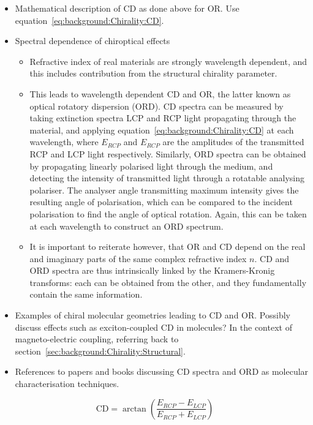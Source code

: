 \begin{itemize}
    \item Mathematical description of CD as done above for OR. Use equation~\ref{eq:background:Chirality:CD}.
    \item Spectral dependence of chiroptical effects
    \begin{itemize}
        \item Refractive index of real materials are strongly wavelength dependent, and this includes contribution from the structural chirality parameter.
        \item This leads to wavelength dependent CD and OR, the latter known as optical rotatory dispersion (ORD). CD spectra can be measured by taking extinction spectra LCP and RCP light propagating through the material, and applying equation~\ref{eq:background:Chirality:CD} at each wavelength, where $E_{RCP}$ and $E_{RCP}$ are the amplitudes of the transmitted RCP and LCP light respectively. Similarly, ORD spectra can be obtained by propagating linearly polarised light through the medium, and detecting the intensity of transmitted light through a rotatable analysing polariser. The analyser angle transmitting maximum intensity gives the resulting angle of polarisation, which can be compared to the incident polarisation to find the angle of optical rotation. Again, this can be taken at each wavelength to construct an ORD spectrum. 
        \item It is important to reiterate however, that OR and CD depend on the real and imaginary parts of the same complex refractive index $n$. CD and ORD spectra are thus intrinsically linked by the Kramers-Kronig transforms: each can be obtained from the other, and they fundamentally contain the same information. 
    \end{itemize}
    \item Examples of chiral molecular geometries leading to CD and OR. Possibly discuss effects such as exciton-coupled CD in molecules? In the context of magneto-electric coupling, referring back to section~\ref{sec:background:Chirality:Structural}.
    \item References to papers and books discussing CD spectra and ORD as molecular characterisation techniques.
\end{itemize}

\begin{equation}\label{eq:background:Chirality:CD}
    \textrm{CD}= \arctan\left( \frac{E_{RCP} - E_{LCP}}{E_{RCP} + E_{LCP}} \right)
\end{equation} 

